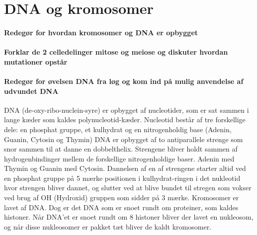 \newpage
\part{DNA og kromosomer}
\subsection*{Redegør for hvordan kromosomer og DNA er opbygget}
\subsection*{Forklar de 2 celledelinger mitose og meiose og diskuter hvordan mutationer opstår}
\subsection*{Redegør for øvelsen DNA fra løg og kom ind på mulig anvendelse af udvundet DNA}
DNA (de-oxy-ribo-nuclein-syre) er opbygget af nucleotider, som er sat sammen i lange kæder som kaldes polynucleotid-kæder. 
Nucleotid består af tre forskellige dele: en phosphat gruppe, et kulhydrat og en nitrogenholdig base (Adenin, Guanin, Cytosin og Thymin)
DNA er opbygget af to antiparallele strenge som snor sammen til at danne en dobbelthelix. Strengene bliver holdt sammen af hydrogenbindinger mellem de forskellige nitrogenholdige baser. Adenin med Thymin og Guanin med Cytosin.
Dannelsen af en af strengene starter altid ved en phosphat gruppe på 5 mærke positionen i kulhydrat-ringen i det nukleotid hvor strengen bliver dannet, og slutter ved at blive bundet til stregen som vokser ved brug af OH (Hydroxid) gruppen som sidder på 3 mærke.
Kromosomer er lavet af DNA. Dog er det DNA som er snoet rundt om proteiner, som kaldes histoner. Når DNA’et er snoet rundt om 8 histoner bliver der lavet en nukleosom, og når disse nukleosomer er pakket tæt bliver de kaldt kromosomer.

